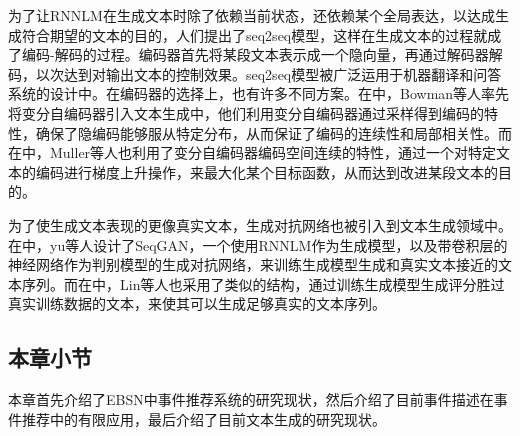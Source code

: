 为了让RNNLM在生成文本时除了依赖当前状态，还依赖某个全局表达，以达成生成符合期望的文本的目的，人们提出了seq2seq模型，这样在生成文本的过程就成了编码-解码的过程。编码器首先将某段文本表示成一个隐向量，再通过解码器解码，以次达到对输出文本的控制效果。seq2seq模型被广泛运用于机器翻译和问答系统的设计中。在编码器的选择上，也有许多不同方案。在\cite{bowman_generating_2015}中，Bowman等人率先将变分自编码器引入文本生成中，他们利用变分自编码器通过采样得到编码的特性，确保了隐编码能够服从特定分布，从而保证了编码的连续性和局部相关性。而在\cite{noauthor_sequence_nodate}中，Muller等人也利用了变分自编码器编码空间连续的特性，通过一个对特定文本的编码进行梯度上升操作，来最大化某个目标函数，从而达到改进某段文本的目的。

为了使生成文本表现的更像真实文本，生成对抗网络也被引入到文本生成领域中。在\cite{yu_seqgan:_2016}中，yu等人设计了SeqGAN，一个使用RNNLM作为生成模型，以及带卷积层的神经网络作为判别模型的生成对抗网络，来训练生成模型生成和真实文本接近的文本序列。而在\cite{lin_adversarial_2017}中，Lin等人也采用了类似的结构，通过训练生成模型生成评分胜过真实训练数据的文本，来使其可以生成足够真实的文本序列。

\subsection{本章小节}
本章首先介绍了EBSN中事件推荐系统的研究现状，然后介绍了目前事件描述在事件推荐中的有限应用，最后介绍了目前文本生成的研究现状。
% 